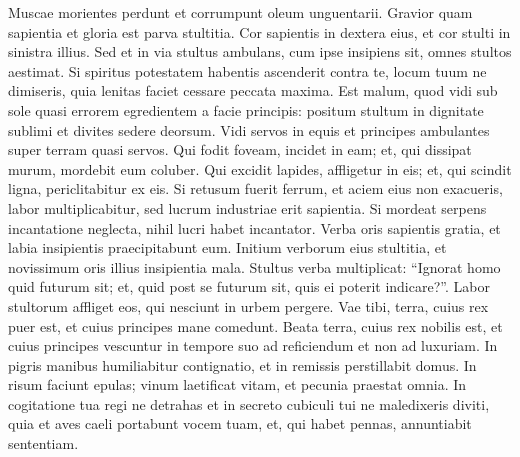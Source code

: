 \begin{biblechapter}  
\verse Muscae morientes perdunt et corrumpunt oleum unguentarii. Gravior quam sapientia et gloria est parva stultitia. 
\verse Cor sapientis in dextera eius, et cor stulti in sinistra illius. 
\verse Sed et in via stultus ambulans, cum ipse insipiens sit, omnes stultos aestimat. 
\verse Si spiritus potestatem habentis ascenderit contra te, locum tuum ne dimiseris, quia lenitas faciet cessare peccata maxima. 
\verse Est malum, quod vidi sub sole quasi errorem egredientem a facie principis:  
\verse positum stultum in dignitate sublimi et divites sedere deorsum. 
\verse Vidi servos in equis et principes ambulantes super terram quasi servos. 
\verse Qui fodit foveam, incidet in eam; et, qui dissipat murum, mordebit eum coluber. 
\verse Qui excidit lapides, affligetur in eis; et, qui scindit ligna, periclitabitur ex eis. 
\verse Si retusum fuerit ferrum, et aciem eius non exacueris, labor multiplicabitur, sed lucrum industriae erit sapientia. 
\verse Si mordeat serpens incantatione neglecta, nihil lucri habet incantator. 
\verse Verba oris sapientis gratia, et labia insipientis praecipitabunt eum. 
\verse Initium verborum eius stultitia, et novissimum oris illius insipientia mala. 
\verse Stultus verba multiplicat: “Ignorat homo quid futurum sit; et, quid post se futurum sit, quis ei poterit indicare?”. 
\verse Labor stultorum affliget eos, qui nesciunt in urbem pergere. 
\verse Vae tibi, terra, cuius rex puer est, et cuius principes mane comedunt. 
\verse Beata terra, cuius rex nobilis est, et cuius principes vescuntur in tempore suo ad reficiendum et non ad luxuriam. 
\verse In pigris manibus humiliabitur contignatio, et in remissis perstillabit domus. 
\verse In risum faciunt epulas; vinum laetificat vitam, et pecunia praestat omnia. 
\verse In cogitatione tua regi ne detrahas et in secreto cubiculi tui ne maledixeris diviti, quia et aves caeli portabunt vocem tuam, et, qui habet pennas, annuntiabit sententiam. 
\end{biblechapter}

